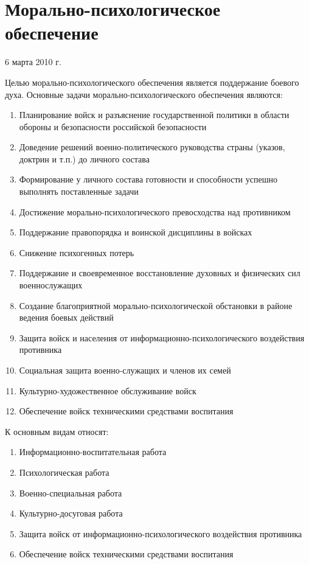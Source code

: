 \documentclass[a4paper,12pt]{article}
\begin{document}
	\section{\bf Морально-психологическое обеспечение}
	\centerline{6 марта 2010 г.}
	Целью морально-психологического обеспечения является поддержание боевого духа.
	Основные задачи морально-психологического обеспечения являются:
	\begin{enumerate}
	\item Планирование войск и разъяснение государственной политики в области обороны и безопасности российской безопасности
	\item Доведение решений военно-политического руководства страны (указов, доктрин и т.п.) до личного состава
	\item Формирование у личного состава готовности и способности успешно выполнять поставленные задачи
	\item Достижение морально-психологического превосходства над противником
	\item Поддержание правопорядка и воинской дисциплины в войсках
	\item Снижение психогенных потерь
	\item Поддержание и своевременное восстановление духовных и физических сил военнослужащих
	\item Создание благоприятной морально-психологической обстановки в районе ведения боевых действий
	\item Защита войск и населения от информационно-психологического воздействия противника
	\item Социальная защита военно-служащих и членов их семей
	\item Культурно-художественное обслуживание войск
	\item Обеспечение войск техническими средствами воспитания
\end{enumerate}

	К основным видам относят:
\begin{enumerate}
	\item Информационно-воспитательная работа
	\item Психологическая работа
	\item Военно-специальная работа
	\item Культурно-досуговая работа
	\item Защита войск от информационно-психологического воздействия противника
	\item Обеспечение войск техническими средствами воспитания
\end{enumerate}
\end{document}
